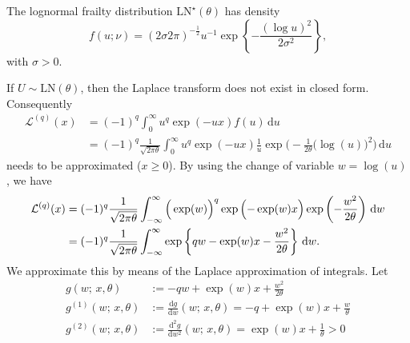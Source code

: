 The lognormal frailty distribution $\mathrm{LN}^\star(\theta)$ has density
\begin{equation}
    f(u; ν) = (2\sigma 2\pi)^{-\frac12} u^{-1} \exp\left\{-\frac{(\log u)^2}{2\sigma^2} \right\},
\end{equation}
with $\sigma>0$.

If $U \sim \text{LN}(\theta)$, then the Laplace transform does not exist in closed form.
Consequently
\begin{align*}
\mathcal{L}^{(q)}(x)
 & = (-1)^q \int_0^\infty u^q \exp(-u x) f(u) \, \textrm{d}u \\
 & = (-1)^q \frac{1}{\sqrt{2 \pi \theta}} \int_0^\infty u^q \exp(-u x) \frac{1}{u} 
 \exp \bigg( - \frac{1}{2 \theta} \Big( \log(u) \Big)^2 \bigg) \, \textrm{d}u
\end{align*}
needs to be approximated ($x \geq 0$). By using the change of variable $w = \log(u)$, we have
\begin{align*}
\mathcal{L}^{(q)}(x)
  & = (-1)^q \frac{1}{\sqrt{2 \pi \theta}} \int_{-\infty}^\infty 
  \Big( \exp(w) \Big)^q \exp \left( -\exp(w) x \vphantom{\Big)} \right) \exp \left( - \frac{w^2}{2\theta} \right) \, \textrm{d}w \\
  & = (-1)^q \frac{1}{\sqrt{2 \pi \theta}} \int_{-\infty}^\infty \exp \left\{ qw - \exp(w) x - \frac{w^2}{2 \theta} \right\} \, \textrm{d}w.
\end{align*}
We approximate this by means of the Laplace approximation of integrals.
Let 
\begin{align*}
g(w;\, x, \theta)       & := - qw + \exp(w) x + \frac{w^2}{2 \theta} \\
g^{(1)}(w;\, x, \theta) & := \frac{\textrm{d} g}{\textrm{d} w}(w;\, x, \theta) = - q + \exp(w) x + \frac{w}{\theta}\\
g^{(2)}(w;\, x, \theta) & := \frac{\textrm{d}^2 g}{\textrm{d} w^2}(w;\, x, \theta) =  \exp(w) x + \frac{1}{\theta} > 0 
\end{align*}

